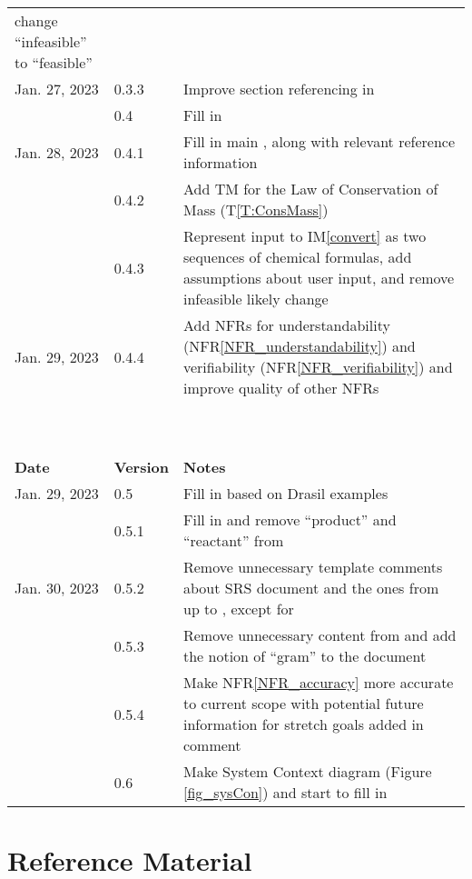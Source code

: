 \documentclass[12pt]{article}
\newcommand{\tref}[1]{T\ref{#1}}
\newcommand{\iref}[1]{IM\ref{#1}}
\newcommand{\nfrref}[1]{NFR\ref{#1}}
\begin{document}
\begin{tabularx}{\textwidth}{p{2.5cm}p{1.5cm}X}
							change ``infeasible'' to ``feasible''\\
Jan. 27, 2023 & 0.3.3 & Improve section referencing in \nameref{sec_revHist}\\
							& 0.4 & Fill in \nameref{sec_funcReqs}\\
Jan. 28, 2023 & 0.4.1 & Fill in main \nameref{sec_nonfuncReqs}, along with
							relevant reference information\\
							& 0.4.2 & Add TM for the Law of Conservation of Mass
							(\tref{T:ConsMass})\\
							& 0.4.3 & Represent input to \iref{convert} as two sequences of chemical
							formulas, add assumptions about user input, and remove infeasible
							likely change\\
Jan. 29, 2023 & 0.4.4 & Add NFRs for understandability
							(\nfrref{NFR_understandability}) and verifiability
							(\nfrref{NFR_verifiability}) and improve quality of other NFRs\\
\bottomrule~\\
~\\
\toprule {\bf Date} & {\bf Version} & {\bf Notes}\\
\midrule
Jan. 29, 2023 & 0.5 & Fill in \nameref{sec_intro} based on Drasil examples\\
							& 0.5.1 & Fill in \nameref{sec_phySystDesc} and remove ``product'' and
							``reactant'' from \nameref{sec_termsDefs}\\
Jan. 30, 2023 & 0.5.2 & Remove unnecessary template comments about SRS document
							and the ones from \nameref{sec_specSysDesc} up to
							\nameref{sec_instance}, except for \nameref{sec_datatypes}\\
							& 0.5.3 & Remove unnecessary content from \nameref{sec_tabSymbs} and
							add the notion of ``gram'' to the document\\
							& 0.5.4 & Make \nfrref{NFR_accuracy} more accurate to current scope with
							potential future information for stretch goals added in comment\\
							& 0.6 & Make System Context diagram (Figure \ref{fig_sysCon}) and start
							to fill in \nameref{sec_sysCon}\\
\bottomrule
\end{tabularx}


\section{Reference Material}
\end{document}
